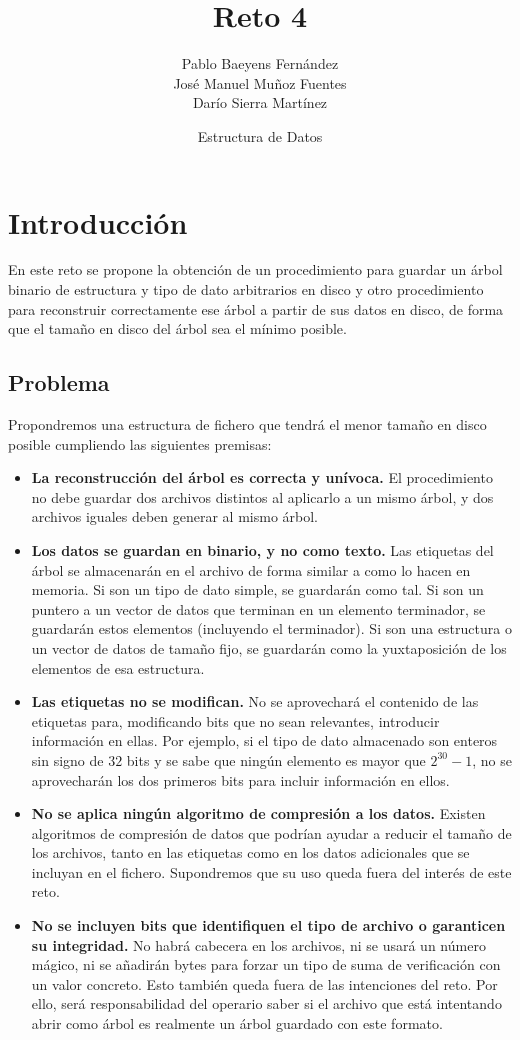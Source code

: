 \documentclass{article}
\title{Reto 4}
\date{Estructura de Datos}
\author{Pablo Baeyens Fernández\\José Manuel Muñoz Fuentes\\Darío Sierra Martínez}
\begin{document}
\maketitle

\section{Introducción}

En este reto se propone la obtención de un procedimiento para guardar un árbol
binario de estructura y tipo de dato arbitrarios en disco y otro procedimiento
para reconstruir correctamente ese árbol a partir de sus datos en disco, de forma
que el tamaño en disco del árbol sea el mínimo posible. \\

\subsection{Problema}

Propondremos una estructura de fichero que tendrá el menor tamaño en disco
posible cumpliendo las siguientes premisas:
\begin{itemize}
	\item \textbf{La reconstrucción del árbol es correcta y unívoca.}
  El procedimiento no debe guardar dos archivos distintos al aplicarlo a un mismo
  árbol, y dos archivos iguales deben generar al mismo árbol.
	\item \textbf{Los datos se guardan en binario, y no como texto.} Las etiquetas
  del árbol se almacenarán en el archivo de forma similar a como lo hacen en
  memoria. Si son un tipo de dato simple, se guardarán como tal. Si son un puntero
  a un vector de datos que terminan en un elemento terminador, se guardarán
  estos elementos (incluyendo el terminador). Si son una estructura o un vector
  de datos de tamaño fijo, se guardarán como la yuxtaposición de los elementos
  de esa estructura.
	\item \textbf{Las etiquetas no se modifican.} No se aprovechará el contenido
  de las etiquetas para, modificando bits que no sean relevantes, introducir
  información en ellas. Por ejemplo, si el tipo de dato almacenado son enteros
  sin signo de $32$ bits y se sabe que ningún elemento es mayor que $2^{30}-1$,
  no se aprovecharán los dos primeros bits para incluir información en ellos.
	\item \textbf{No se aplica ningún algoritmo de compresión a los datos.}
  Existen algoritmos de compresión de datos que podrían ayudar a reducir el
  tamaño de los archivos, tanto en las etiquetas como en los datos adicionales
  que se incluyan en el fichero. Supondremos que su uso queda fuera del interés
  de este reto.
	\item \textbf{No se incluyen bits que identifiquen el tipo de archivo
  o garanticen su integridad.} No habrá cabecera en los archivos, ni se usará un
  número mágico, ni se añadirán bytes para forzar un tipo de suma de verificación
  con un valor concreto. Esto también queda fuera de las intenciones del reto.
  Por ello, será responsabilidad del operario saber si el archivo que está
  intentando abrir como árbol es realmente un árbol guardado con este formato.
\end{itemize}
\end{document}
